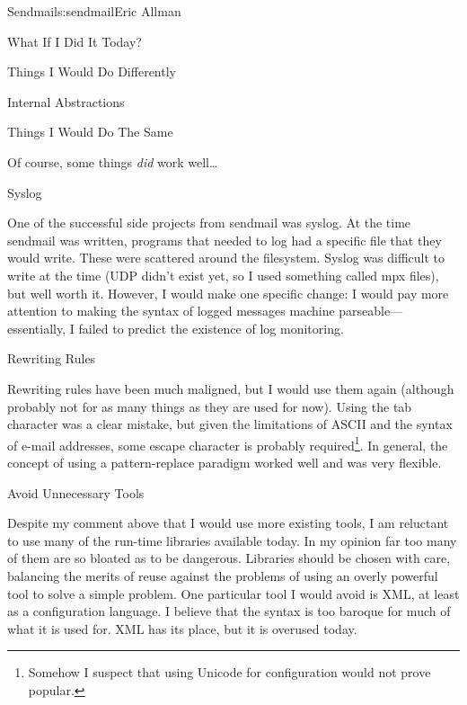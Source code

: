 \begin{aosachapter}{Sendmail}{s:sendmail}{Eric Allman}
\begin{aosasect1}{What If I Did It Today?}
\begin{aosasect2}{Things I Would Do Differently}
\begin{aosasect3}{Internal Abstractions}
\end{aosasect3}

\end{aosasect2}

\begin{aosasect2}{Things I Would Do The Same}

Of course, some things \emph{did} work well\ldots

\begin{aosasect3}{Syslog}

One of the successful side projects from sendmail was syslog. At the
time sendmail was written, programs that needed to log had a specific
file that they would write. These were scattered around the
filesystem.  Syslog was difficult to write at the time (UDP didn't
exist yet, so I used something called mpx files), but well worth
it. However, I would make one specific change: I would pay more
attention to making the syntax
of logged messages
machine parseable---essentially, I
failed to predict the existence of log monitoring.

\end{aosasect3}

\begin{aosasect3}{Rewriting Rules}

Rewriting rules have been much maligned, but I would use them again
(although probably not for as many things as they are used for now).
Using the tab character was a clear mistake, but given the limitations
of ASCII and the syntax of e-mail addresses, some escape character is
probably required\footnote{Somehow I suspect that using Unicode for
configuration would not prove popular.}. In general, the concept of
using a pattern-replace paradigm worked well and was very flexible.

\end{aosasect3}

\begin{aosasect3}{Avoid Unnecessary Tools}

Despite my comment above that I would use more existing tools, I am
reluctant to use many of the run-time libraries available today. In my
opinion far too many of them are so bloated as to be dangerous.
Libraries should be chosen with care, balancing the merits of reuse
against the problems of using an overly powerful tool to solve a
simple problem. One particular tool I would avoid is XML, at least as
a configuration language. I believe that the syntax is too baroque for
much of what it is used for. XML has its place, but it is overused
today.


\end{aosasect3}
\end{aosasect2}
\end{aosasect1}
\end{aosachapter}
